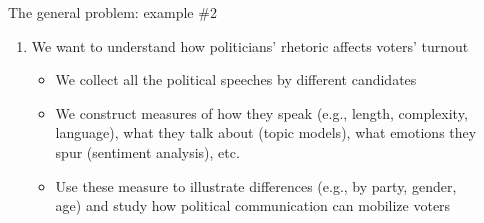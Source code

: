 \documentclass[english]{beamer}
\begin{document}
\begin{frame}{The general problem: example \#2}

\begin{enumerate}
\item We want to understand how politicians' rhetoric affects voters' turnout

\vspace{7pt}

\begin{itemize}
\setlength{\itemindent}{-0.9em}
\setlength{\itemsep}{1.7em}
 
\item We collect all the political speeches by different candidates

\item We construct measures of how they speak (e.g., length, complexity, \\
\hspace{-9pt}language), what they talk about (topic models), what emotions they \\
\hspace{-9pt}spur (sentiment analysis), etc.

\item Use these measure to illustrate differences (e.g., by party, gender, \\
\hspace{-9pt}age) and study how  political communication can mobilize voters

\end{itemize}

\end{enumerate}

\end{frame}
\end{document}
